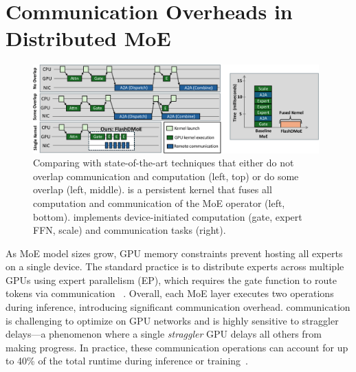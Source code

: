 \section{Communication Overheads in Distributed MoE}\label{sec:communication-overheads-in-distributed-moe}
\begin{figure}[!ht]
    \centering
    \includegraphics[width=0.98\textwidth, keepaspectratio]{figures/intro-fig}
    \caption{Comparing \sysname with state-of-the-art techniques that either do not overlap communication and
    computation (left, top) or do some overlap (left, middle). \sysname is a persistent kernel that fuses all
    computation and communication of the MoE operator (left, bottom). \sysname implements
    device-initiated computation (gate, expert FFN, scale) and communication tasks (right).}
    \label{fig:intro}
\end{figure}
As MoE model sizes grow, GPU memory constraints prevent hosting all experts on a single device.
The standard practice is to distribute experts across multiple GPUs using expert parallelism (EP),
which requires the gate function to route tokens via \alltoall communication
~\cite{deepep, arctic, dbrx, 10.1145/3577193.3593704}.
Overall, each MoE layer executes two \alltoall operations during inference,
introducing significant communication overhead. \alltoall communication is challenging to optimize on GPU networks
and is highly sensitive to straggler delays---a phenomenon where a single \emph{straggler} GPU delays
all others from making progress.
In practice, these communication operations can account for up to 40\% of the total runtime during inference or
training~\cite{10.1145/3603269.3604869, MLSYS2024_339caf45}.
